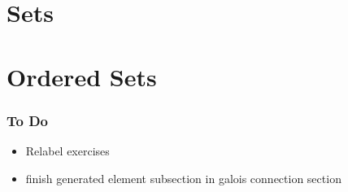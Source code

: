 \documentclass{book}
\begin{document}
	
	
	
	
	
	
	
	
	
	
	
	
	
	
	
	
	
	
	
	\part{Sets}
	
	
	
	
	
	
	
	
	
	
	
	
	
	
	
	
	
	
	
	
	
	
	
	
	
	
	
	
	
	
	
	
	
	
	
	
	
	
	
	
	
	
	
	
	
	
	
	
	
	
	
	
	
	
	
	
	\newpage
	\part{Ordered Sets}
	
	\section{To Do}
	
	
	\begin{itemize}
		\item Relabel exercises
		\item finish generated element subsection in galois connection section
	\end{itemize}
	
\end{document}
